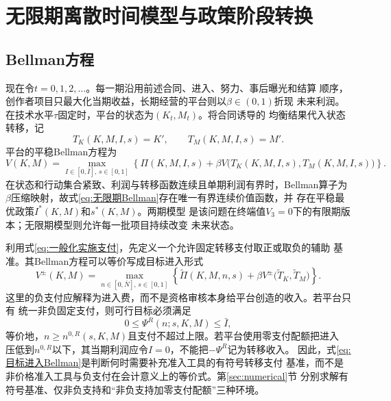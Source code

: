 \documentclass[UTF8, a4paper, 12pt, fontset=fandol]{ctexart}
\theoremstyle{definition}
\theoremstyle{remark}
\begin{document}
\section{无限期离散时间模型与政策阶段转换}
\label{sec:infinite-horizon}

\subsection{Bellman方程}
现在令$t=0,1,2,\ldots$。每一期沿用前述合同、进入、努力、事后曝光和结算
顺序，创作者项目只最大化当期收益，长期经营的平台则以$\beta\in(0,1)$折现
未来利润。在技术水平$\tau$固定时，平台的状态为$(K_t,M_t)$。将合同诱导的
均衡结果代入状态转移，记
\begin{equation*}
  T_K(K,M,I,s)=K',
  \qquad
  T_M(K,M,I,s)=M'.
\end{equation*}
平台的平稳Bellman方程为
\begin{equation}
  V(K,M)
  =\max_{I\in[0,\bar I],\,s\in[0,1]}
  \left\{
    \Pi(K,M,I,s)
    +\beta V\bigl(T_K(K,M,I,s),T_M(K,M,I,s)\bigr)
  \right\}.
  \label{eq:无限期Bellman}
\end{equation}
在状态和行动集合紧致、利润与转移函数连续且单期利润有界时，Bellman算子为
$\beta$压缩映射，故式\eqref{eq:无限期Bellman}存在唯一有界连续价值函数，并
存在平稳最优政策$I^*(K,M)$和$s^*(K,M)$\citep{stokey1989recursive}。两期模型
是该问题在终端值$V_3=0$下的有限期版本；无限期模型则允许每一批项目持续改变
未来状态。

利用式\eqref{eq:一般化实施支付}，先定义一个允许固定转移支付取正或取负的辅助
基准。其Bellman方程可以等价写成目标进入形式
\begin{equation}
  V^{\pm}(K,M)
  =\max_{n\in[0,\bar N],\,s\in[0,1]}
  \left\{
    \widetilde\Pi(K,M,n,s)
    +\beta V^{\pm}\bigl(\widetilde T_K,\widetilde T_M\bigr)
  \right\}.
  \label{eq:目标进入Bellman}
\end{equation}
这里的负支付应解释为进入费，而不是资格审核本身给平台创造的收入。若平台只有
统一非负固定支付，则可行目标必须满足
\begin{equation*}
  0\leq\Psi^R(n;s,K,M)\leq\bar I,
\end{equation*}
等价地，$n\geq n^{0,R}(s,K,M)$且支付不超过上限。若平台使用零支付配额把进入
压低到$n^{0,R}$以下，其当期利润应令$I=0$，不能把$-\Psi^R$记为转移收入。
因此，式\eqref{eq:目标进入Bellman}是判断何时需要补充准入工具的有符号转移支付
基准，而不是非价格准入工具与负支付在会计意义上的等价式。第\ref{sec:numerical}节
分别求解有符号基准、仅非负支持和“非负支持加零支付配额”三种环境。
\end{document}
